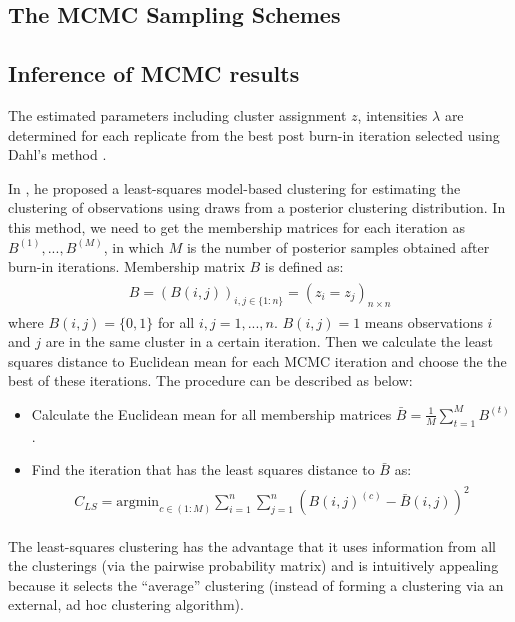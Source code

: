 \documentclass[12pt]{article}
\begin{document}
\subsection{The MCMC Sampling Schemes}
\subsection{Inference of MCMC results}\label{sec:sum_mcmc}
The estimated parameters including cluster assignment $z$, intensities $
\lambda$ are determined for each replicate from the best post burn-in
iteration selected using Dahl's method \citep{Dahl:2006}.


In \cite{Dahl:2006}, he proposed a least-squares model-based
clustering for estimating the clustering of observations using draws
from a posterior clustering distribution. In this method, we need to
get the membership matrices for each iteration as
$B^{(1)},...,B^{(M)}$, in which $M$ is the number of posterior samples
obtained after burn-in iterations. Membership matrix $B$ is defined as:
\begin{align}
  \begin{split}
    B = (B(i,j))_{i,j\in \{1:n\}} = (z_i = z_j)_{n\times n}
  \end{split}
\end{align}
where $B(i,j) = \{0,1\}$ for all $i,j = 1,...,n$. $B(i,j)=1$ means
observations $i$ and $j$ are in the same cluster in a certain
iteration. Then we calculate the least squares distance to Euclidean
mean for each MCMC iteration and choose the the best of these
iterations. The procedure can be described as below:
\begin{itemize}
\item Calculate the Euclidean mean for all membership matrices
  $\bar{B} = \frac{1}{M} \sum_{t=1}^M B^{(t)}$. 
\item Find the iteration that has the least squares distance to
  $\bar{B}$ as:
  \begin{align}
    \begin{split}
      C_{LS} = \text{argmin}_{c \in (1:M)} \sum_{i=1}^n \sum_{j=1}^n
      (B(i,j)^{(c)} - \bar{B}(i,j))^2
    \end{split}
  \end{align}
\end{itemize}


The least-squares clustering has the advantage that it uses
information from all the clusterings (via the pairwise probability
matrix) and is intuitively appealing because it selects the “average”
clustering (instead of forming a clustering via an external, ad hoc
clustering algorithm).
\end{document}
